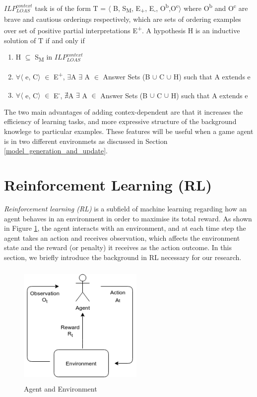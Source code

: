 \documentclass[12pt,twoside]{report}
\theoremstyle{plain}
\theoremstyle{definition}
\begin{document}
$ILP_{LOAS}^{context}$ task is of the form T = $\langle$ B, S\textsubscript{M}, E\textsubscript{+}, E\textsubscript{-}, O\textsuperscript{b},O\textsuperscript{c}$\rangle$ where O\textsuperscript{b} and O\textsuperscript{c} are brave and cautious orderings respectively, which are sets of ordering examples over set of positive partial interpretations E\textsuperscript{+}.
A hypothesis H is an inductive solution of T if and only if
\begin{enumerate}
\item H $\subseteq$ S\textsubscript{M} in $ILP_{LOAS}^{context}$
\item $\forall$$\langle$ e, C$\rangle$ $\in$ E\textsuperscript{+}, $\exists$A $\exists$ A $\in$ Answer Sets (B $\cup$ C $\cup$ H) such that A extends e
\item $\forall$$\langle$ e, C$\rangle$ $\in$ E\textsuperscript{-}, $\nexists$A $\exists$ A $\in$ Answer Sets (B $\cup$ C $\cup$ H) such that A extends e
\end{enumerate}

The two main advantages of adding contex-dependent are that it increases the efficiency of learning tasks, and more expressive structure of the background knowlege to particular examples. These features will be useful when a game agent is in two different environmets as discussed in Section \ref{model_generation_and_update}.

\section{Reinforcement Learning (RL)}
\label{rl}
\textit{Reinforcement learning (RL)} is a subfield of machine learning regarding how an agent behaves in an environment in order to maximise its total reward. As shown in Figure \ref{agent_env}, the agent interacts with an environment, and at each time step the agent takes an action and receives observation, which affects the environment state and the reward (or penalty) it receives as the action outcome. In this section, we briefly introduce the background in RL necessary for our research.

\begin{figure}[!htb]
\centering
\includegraphics[width=6cm, height=6cm]{./figures/agent_env}
\caption{Agent and Environment}
\label{agent_env}
\end{figure}
\end{document}
